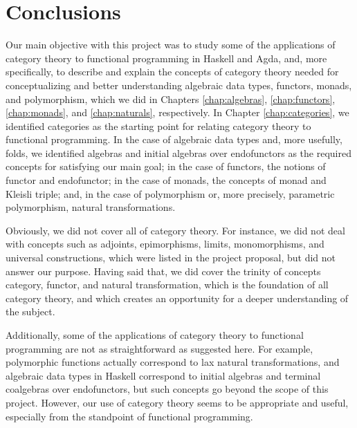 \chapter{Conclusions}
\label{chap:conclusions}

\begin{epigraphs}
\end{epigraphs}

Our main objective with this project was to study some of the
applications of category theory to functional programming in Haskell
and Agda, and, more specifically, to describe and explain the concepts
of category theory needed for conceptualizing and better understanding
algebraic data types, functors, monads, and polymorphism, which we did
in Chapters \ref{chap:algebras}, \ref{chap:functors},
\ref{chap:monads}, and \ref{chap:naturals}, respectively. In Chapter
\ref{chap:categories}, we identified categories as the starting point
for relating category theory to functional programming. In the case of
algebraic data types and, more usefully, folds, we identified algebras
and initial algebras over endofunctors as the required concepts for
satisfying our main goal; in the case of functors, the notions of
functor and endofunctor; in the case of monads, the concepts of monad
and Kleisli triple; and, in the case of polymorphism or, more
precisely, parametric polymorphism, natural transformations.

Obviously, we did not cover all of category theory. For instance, we
did not deal with concepts such as adjoints, epimorphisms, limits,
monomorphisms, and universal constructions, which were listed in the
project proposal, but did not answer our purpose. Having said that, we
did cover the trinity of concepts category, functor, and natural
transformation, which is the foundation of all category theory, and
which creates an opportunity for a deeper understanding of the
subject.

Additionally, some of the applications of category theory to
functional programming are not as straightforward as suggested here.
For example, polymorphic functions actually correspond to lax natural
transformations, and algebraic data types in Haskell correspond to
initial algebras and terminal coalgebras over endofunctors, but such
concepts go beyond the scope of this project. However, our use of
category theory seems to be appropriate and useful, especially from
the standpoint of functional programming.

